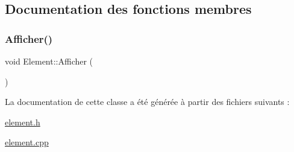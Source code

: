 \subsection{Documentation des fonctions membres}
\mbox{\label{class_element_a14a6e1d1736f739908fe0a6a24089987}} 
\subsubsection{\texorpdfstring{Afficher()}{Afficher()}}
{\footnotesize\ttfamily void Element\+::\+Afficher (\begin{DoxyParamCaption}{ }\end{DoxyParamCaption})\hspace{0.3cm}{\ttfamily [virtual]}}



La documentation de cette classe a été générée à partir des fichiers suivants \+:\begin{DoxyCompactItemize}
\item 
\hyperlink{element_8h}{element.\+h}\item 
\hyperlink{element_8cpp}{element.\+cpp}\end{DoxyCompactItemize}
